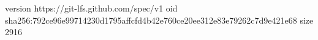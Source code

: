 version https://git-lfs.github.com/spec/v1
oid sha256:792ce96e99714230d1795affcfd4b42e760ce20ee312e83e79262c7d9e421e68
size 2916
